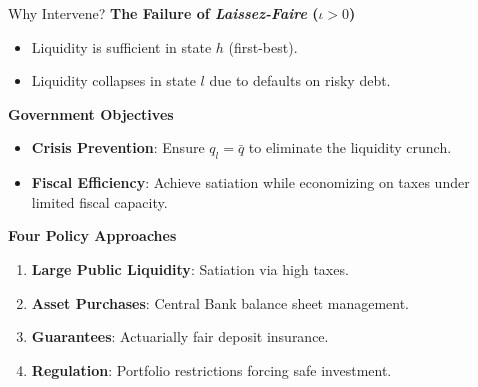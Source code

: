\documentclass[11pt,aspectratio=169]{beamer}
\begin{document}
\begin{frame}{Why Intervene?}
\small
\textbf{The Failure of \textit{Laissez-Faire} ($\iota > 0$)}
\begin{itemize}
    \item Liquidity is sufficient in state $h$ (first-best).
    \item Liquidity collapses in state $l$ due to defaults on risky debt.
\end{itemize}

\vspace{0.3cm}
\textbf{Government Objectives}
\begin{itemize}
    \item \textbf{Crisis Prevention}: Ensure $q_l = \bar{q}$ to eliminate the liquidity crunch.
    \item \textbf{Fiscal Efficiency}: Achieve satiation while economizing on taxes under limited fiscal capacity.
\end{itemize}
  
\vspace{0.3cm}
\textbf{Four Policy Approaches}
\begin{enumerate}
    \item \textbf{Large Public Liquidity}: Satiation via high taxes.
    \item \textbf{Asset Purchases}: Central Bank balance sheet management.
    \item \textbf{Guarantees}: Actuarially fair deposit insurance.
    \item \textbf{Regulation}: Portfolio restrictions forcing safe investment.
\end{enumerate}
\end{frame}
\end{document}
